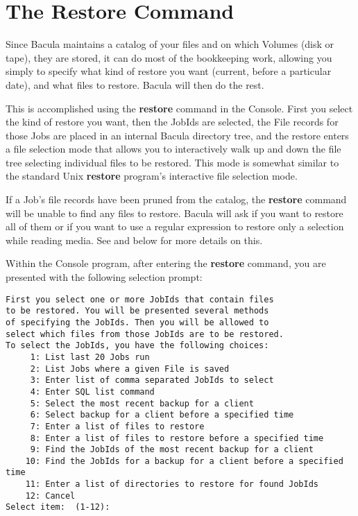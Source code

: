 \label{Example1}
\section{The Restore Command}

Since Bacula maintains a catalog of your files and on which Volumes (disk or
tape), they are stored, it can do most of the bookkeeping work, allowing you
simply to specify what kind of restore you want (current, before a particular
date), and what files to restore. Bacula will then do the rest. 

This is accomplished using the {\bf restore} command in the Console. First you
select the kind of restore you want, then the JobIds are selected,
the File records for those Jobs are placed in an internal Bacula directory
tree, and the restore enters a file selection mode that allows you to
interactively walk up and down the file tree selecting individual files to be
restored. This mode is somewhat similar to the standard Unix {\bf restore}
program's interactive file selection mode. 

If a Job's file records have been pruned from the catalog, the {\bf restore}
command will be unable to find any files to restore. Bacula will ask if you
want to restore all of them or if you want to use a regular expression to
restore only a selection while reading media. See  and below for more details on this.

Within the Console program, after entering the {\bf restore} command, you are
presented with the following selection prompt:  

\footnotesize
\begin{verbatim}
First you select one or more JobIds that contain files
to be restored. You will be presented several methods
of specifying the JobIds. Then you will be allowed to
select which files from those JobIds are to be restored.
To select the JobIds, you have the following choices:
     1: List last 20 Jobs run
     2: List Jobs where a given File is saved
     3: Enter list of comma separated JobIds to select
     4: Enter SQL list command
     5: Select the most recent backup for a client
     6: Select backup for a client before a specified time
     7: Enter a list of files to restore
     8: Enter a list of files to restore before a specified time
     9: Find the JobIds of the most recent backup for a client
    10: Find the JobIds for a backup for a client before a specified time
    11: Enter a list of directories to restore for found JobIds
    12: Cancel
Select item:  (1-12):
\end{verbatim}
\normalsize

